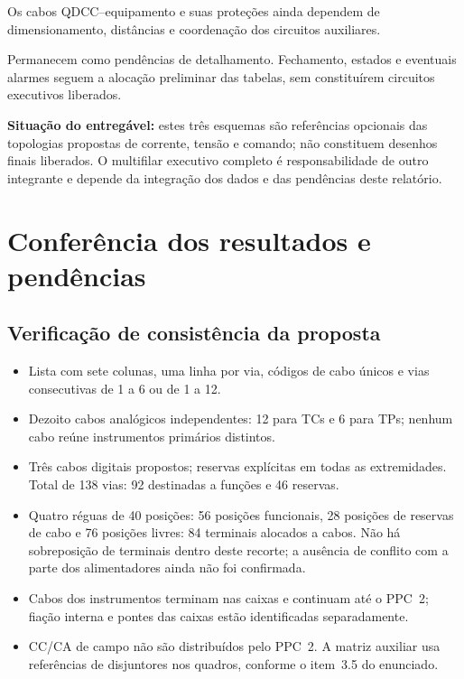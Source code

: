 \documentclass[11pt,a4paper]{article}
\begin{document}
Os cabos QDCC--equipamento e suas proteções ainda dependem de dimensionamento,
distâncias e coordenação dos circuitos auxiliares.

Permanecem como pendências de detalhamento. Fechamento, estados e
eventuais alarmes seguem a alocação preliminar das tabelas, sem
constituírem circuitos executivos liberados.

\textbf{Situação do entregável:} estes três esquemas são referências opcionais
das topologias propostas de corrente, tensão e comando; não constituem desenhos
finais liberados. O multifilar executivo completo é responsabilidade de outro
integrante e depende da integração dos dados e das pendências deste relatório.

\clearpage
\section{Conferência dos resultados e pendências}\label{sec:pendencias}
\subsection{Verificação de consistência da proposta}
\begin{itemize}
\item Lista com sete colunas, uma linha por via, códigos de cabo únicos e vias
consecutivas de 1 a 6 ou de 1 a 12.
\item Dezoito cabos analógicos independentes: 12 para TCs e 6 para TPs;
nenhum cabo reúne instrumentos primários distintos.
\item Três cabos digitais propostos; reservas explícitas em todas as extremidades.
Total de 138 vias: 92 destinadas a funções e 46 reservas.
\item Quatro réguas de 40 posições: 56 posições funcionais, 28 posições de
reservas de cabo e 76 posições livres: 84 terminais alocados a cabos.
Não há sobreposição de terminais dentro deste recorte; a ausência de conflito
com a parte dos alimentadores ainda não foi confirmada.
\item Cabos dos instrumentos terminam nas caixas e continuam até o PPC~2;
fiação interna e pontes das caixas estão identificadas separadamente.
\item CC/CA de campo não são distribuídos pelo PPC~2. A matriz auxiliar usa
referências de disjuntores nos quadros, conforme o item~3.5 do enunciado.
\end{itemize}
\end{document}

